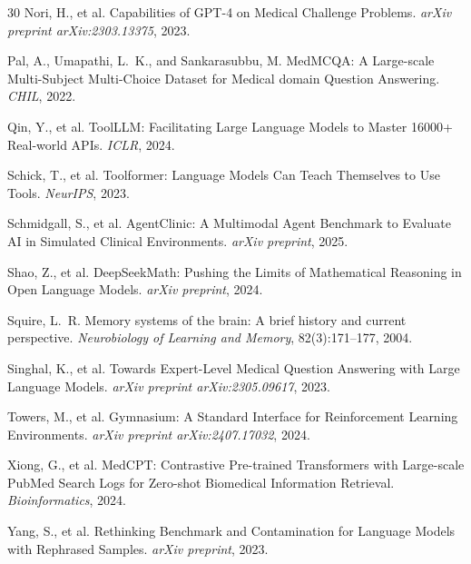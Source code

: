 \documentclass{article}
\begin{document}
\begin{thebibliography}{30}
Nori, H., et al.
\newblock Capabilities of GPT-4 on Medical Challenge Problems.
\newblock \emph{arXiv preprint arXiv:2303.13375}, 2023.

Pal, A., Umapathi, L.~K., and Sankarasubbu, M.
\newblock MedMCQA: A Large-scale Multi-Subject Multi-Choice Dataset for Medical domain Question Answering.
\newblock \emph{CHIL}, 2022.

Qin, Y., et al.
\newblock ToolLLM: Facilitating Large Language Models to Master 16000+ Real-world APIs.
\newblock \emph{ICLR}, 2024.

Schick, T., et al.
\newblock Toolformer: Language Models Can Teach Themselves to Use Tools.
\newblock \emph{NeurIPS}, 2023.

Schmidgall, S., et al.
\newblock AgentClinic: A Multimodal Agent Benchmark to Evaluate AI in Simulated Clinical Environments.
\newblock \emph{arXiv preprint}, 2025.

Shao, Z., et al.
\newblock DeepSeekMath: Pushing the Limits of Mathematical Reasoning in Open Language Models.
\newblock \emph{arXiv preprint}, 2024.

Squire, L.~R.
\newblock Memory systems of the brain: A brief history and current perspective.
\newblock \emph{Neurobiology of Learning and Memory}, 82(3):171--177, 2004.

Singhal, K., et al.
\newblock Towards Expert-Level Medical Question Answering with Large Language Models.
\newblock \emph{arXiv preprint arXiv:2305.09617}, 2023.

Towers, M., et al.
\newblock Gymnasium: A Standard Interface for Reinforcement Learning Environments.
\newblock \emph{arXiv preprint arXiv:2407.17032}, 2024.

Xiong, G., et al.
\newblock MedCPT: Contrastive Pre-trained Transformers with Large-scale PubMed Search Logs for Zero-shot Biomedical Information Retrieval.
\newblock \emph{Bioinformatics}, 2024.

Yang, S., et al.
\newblock Rethinking Benchmark and Contamination for Language Models with Rephrased Samples.
\newblock \emph{arXiv preprint}, 2023.


\end{thebibliography}
\end{document}
